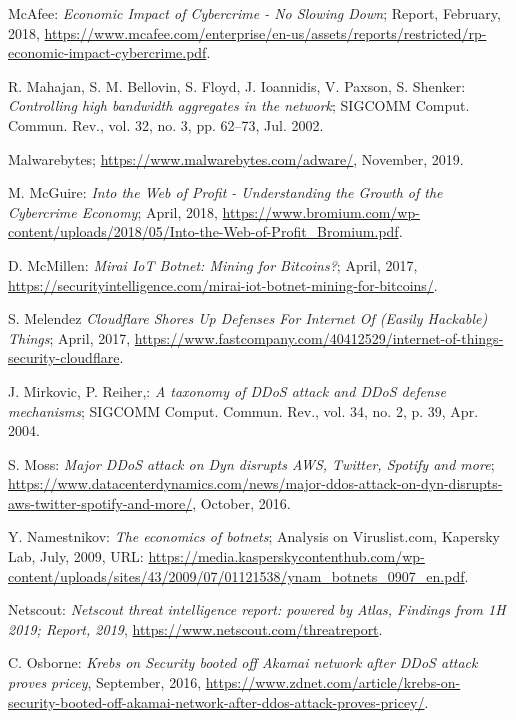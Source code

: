 \begin{thebibliography}{99}
 McAfee: \emph{Economic Impact of Cybercrime - No Slowing Down}; Report, February, 2018, \url{https://www.mcafee.com/enterprise/en-us/assets/reports/restricted/rp-economic-impact-cybercrime.pdf}.

 R. Mahajan, S. M. Bellovin, S. Floyd, J. Ioannidis, V. Paxson, S. Shenker: \emph{Controlling high bandwidth aggregates in the network}; SIGCOMM Comput. Commun. Rev., vol. 32, no. 3, pp. 62--73, Jul. 2002.

 Malwarebytes; \url{https://www.malwarebytes.com/adware/}, November, 2019.

 M. McGuire: \emph{Into the Web of Profit - Understanding the Growth of the Cybercrime Economy}; April, 2018, \url{https://www.bromium.com/wp-content/uploads/2018/05/Into-the-Web-of-Profit_Bromium.pdf}.

 D. McMillen: \emph{Mirai IoT Botnet: Mining for Bitcoins?}; April, 2017, \url{https://securityintelligence.com/mirai-iot-botnet-mining-for-bitcoins/}.

 S. Melendez \emph{Cloudflare Shores Up Defenses For Internet Of (Easily Hackable) Things}; April, 2017, \url{https://www.fastcompany.com/40412529/internet-of-things-security-cloudflare}.

 J. Mirkovic, P. Reiher,: \emph{A taxonomy of DDoS attack and DDoS defense mechanisms}; SIGCOMM Comput. Commun. Rev., vol. 34, no. 2, p. 39, Apr. 2004.

 S. Moss: \emph{Major DDoS attack on Dyn disrupts AWS, Twitter, Spotify and more}; \url{https://www.datacenterdynamics.com/news/major-ddos-attack-on-dyn-disrupts-aws-twitter-spotify-and-more/}, October, 2016.

 Y. Namestnikov: \emph{The economics of botnets}; Analysis on Viruslist.com, Kapersky Lab, July, 2009, URL: \url{https://media.kasperskycontenthub.com/wp-content/uploads/sites/43/2009/07/01121538/ynam_botnets_0907_en.pdf}.

 Netscout: \emph{Netscout threat intelligence report: powered by Atlas, Findings from 1H 2019; Report, 2019}, \url{https://www.netscout.com/threatreport}.

 C. Osborne: \emph{Krebs on Security booted off Akamai network after DDoS attack proves pricey}, September, 2016, \url{https://www.zdnet.com/article/krebs-on-security-booted-off-akamai-network-after-ddos-attack-proves-pricey/}.


\end{thebibliography}
